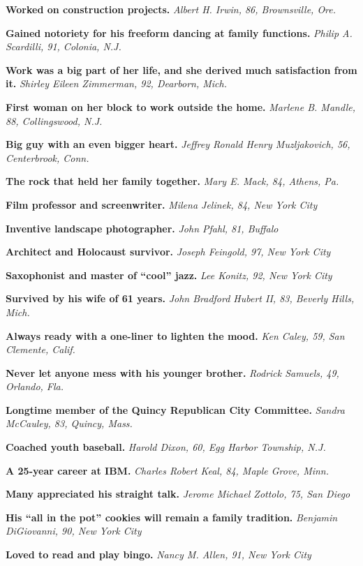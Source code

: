 \textbf{Worked on construction projects.} \emph{Albert H. Irwin, 86,
Brownsville, Ore.}

\textbf{Gained notoriety for his freeform dancing at family functions.}
\emph{Philip A. Scardilli, 91, Colonia, N.J.}

\textbf{Work was a big part of her life, and she derived much
satisfaction from it.} \emph{Shirley Eileen Zimmerman, 92, Dearborn,
Mich.}

\textbf{First woman on her block to work outside the home.}
\emph{Marlene B. Mandle, 88, Collingswood, N.J.}

\textbf{Big guy with an even bigger heart.} \emph{Jeffrey Ronald Henry
Muzljakovich, 56, Centerbrook, Conn.}

\textbf{The rock that held her family together.} \emph{Mary E. Mack, 84,
Athens, Pa.}

\textbf{Film professor and screenwriter.} \emph{Milena Jelinek, 84, New
York City}

\textbf{Inventive landscape photographer.} \emph{John Pfahl, 81,
Buffalo}

\textbf{Architect and Holocaust survivor.} \emph{Joseph Feingold, 97,
New York City}

\textbf{Saxophonist and master of ``cool'' jazz.} \emph{Lee Konitz, 92,
New York City}

\textbf{Survived by his wife of 61 years.} \emph{John Bradford Hubert
II, 83, Beverly Hills, Mich.}

\textbf{Always ready with a one-liner to lighten the mood.} \emph{Ken
Caley, 59, San Clemente, Calif.}

\textbf{Never let anyone mess with his younger brother.} \emph{Rodrick
Samuels, 49, Orlando, Fla.}

\textbf{Longtime member of the Quincy Republican City Committee.}
\emph{Sandra McCauley, 83, Quincy, Mass.}

\textbf{Coached youth baseball.} \emph{Harold Dixon, 60, Egg Harbor
Township, N.J.}

\textbf{A 25-year career at IBM.} \emph{Charles Robert Keal, 84, Maple
Grove, Minn.}

\textbf{Many appreciated his straight talk.} \emph{Jerome Michael
Zottolo, 75, San Diego}

\textbf{His ``all in the pot'' cookies will remain a family tradition.}
\emph{Benjamin DiGiovanni, 90, New York City}

\textbf{Loved to read and play bingo.} \emph{Nancy M. Allen, 91, New
York City}

